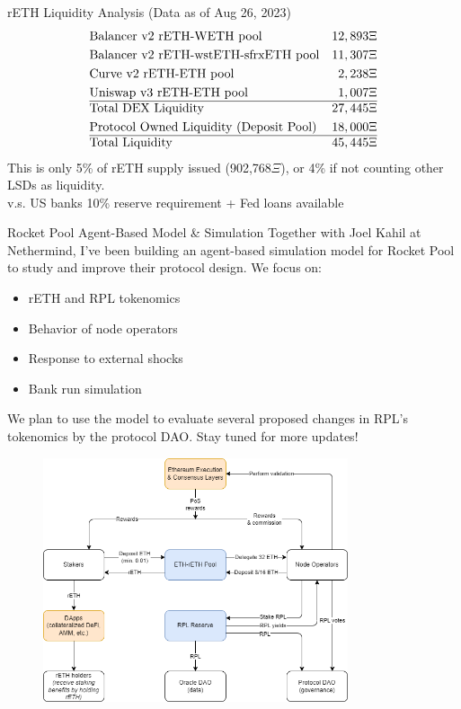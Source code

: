 \documentclass{beamer}
\begin{document}
\begin{frame}{rETH Liquidity Analysis}
    (Data as of Aug 26, 2023)
    \begin{align*}
        &\text{Balancer v2 rETH-WETH pool} & 12,893\Xi\\
        &\text{Balancer v2 rETH-wstETH-sfrxETH pool} & 11,307\Xi\\
        &\text{Curve v2 rETH-ETH pool} & 2,238\Xi\\
        &\text{Uniswap v3 rETH-ETH pool} & 1,007\Xi\\
        \hline
        &\text{Total DEX Liquidity} & 27,445\Xi\\
        &\text{Protocol Owned Liquidity (Deposit Pool)} & 18,000\Xi\\
        \hline
        &\text{Total Liquidity} & 45,445\Xi\\
    \end{align*}
    This is only 5\% of rETH supply issued (902,768$\Xi$), or 4\% if not counting other LSDs as liquidity.\\
    v.s. US banks 10\% reserve requirement + Fed loans available
\end{frame}

\begin{frame}{Rocket Pool Agent-Based Model \& Simulation}
    Together with Joel Kahil at Nethermind, I've been building an agent-based simulation model for Rocket Pool to study and improve their protocol design. We focus on:\\
    \begin{itemize}
        \item rETH and RPL tokenomics
        \item Behavior of node operators
        \item Response to external shocks
        \item Bank run simulation
    \end{itemize}
    We plan to use the model to evaluate several proposed changes in RPL's tokenomics by the protocol DAO. Stay tuned for more updates!
\end{frame}

\begin{frame}
    \begin{figure}
        \centering
        \includegraphics[width=0.8\textwidth]{figures/Rocketpool tokenomics.png}
    \end{figure}
\end{frame}
\end{document}
